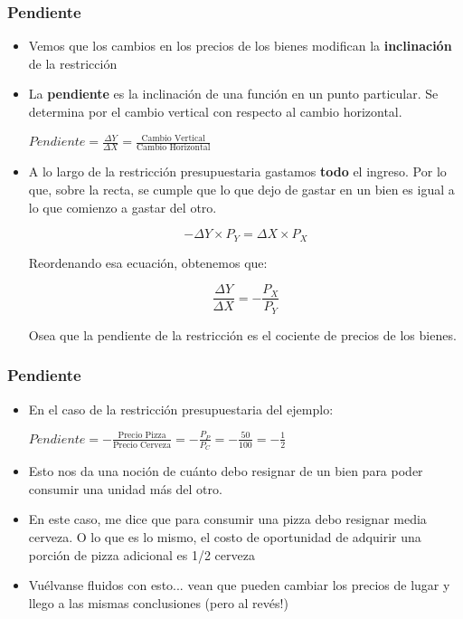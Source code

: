 \documentclass{beamer}
\begin{document}
\begin{frame}
\frametitle{Pendiente}
\begin{itemize}
    \item Vemos que los cambios en los precios de los bienes modifican la \textbf{inclinación} de la restricción 
    \item La \textbf{pendiente} es la inclinación de una función en un punto particular. Se determina por el cambio vertical con respecto al cambio horizontal. \\ 
     \begin{center}
        $Pendiente =\frac{\Delta Y}{\Delta X} = \frac{\text{Cambio Vertical}}
    {\text{Cambio Horizontal}}$
    \end{center}
    \vspace{1mm}
    \item A lo largo de la restricción presupuestaria gastamos \textbf{todo} el ingreso. Por lo que, sobre la recta, se cumple que lo que dejo de gastar en un bien es igual a lo que comienzo a gastar del otro. 
    \vspace{-7mm}
    \begin{center}
    \[-\Delta Y \times P_Y = \Delta X \times P_X \]
    \end{center}
    \vspace{-4mm}
    Reordenando esa ecuación, obtenemos que:     \vspace{-5mm}
    \begin{center}
    \[\frac{\Delta Y}{\Delta X} = -\frac{P_X}{P_Y} \]
    \end{center}
    Osea que la pendiente de la restricción es el cociente de precios de los bienes. 

\end{itemize} 
\end{frame}

\begin{frame}
\frametitle{Pendiente}
    \begin{itemize}
        \item En el caso de la restricción presupuestaria del ejemplo:  \\
        \vspace{2mm}
        \begin{center}
            $Pendiente = - \frac{\text{Precio Pizza}}{\text{Precio Cerveza}}= -\frac{P_P}{P_C} = -\frac{50}{100} = -\frac{1}{2}$
        \end{center}
        \vspace{2mm}
        \item Esto nos da una noción de cuánto debo resignar de un bien para poder consumir una unidad más del otro.
        \item En este caso, me dice que para consumir una pizza debo resignar media cerveza. O lo que es lo mismo, el costo de oportunidad de adquirir una porción de pizza adicional es 1/2 cerveza
        \item Vuélvanse fluidos con esto... vean que pueden cambiar los precios de lugar y llego a las mismas conclusiones (pero al revés!)
    \end{itemize}
\end{frame}
\end{document}
